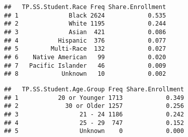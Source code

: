 \documentclass[]{article}
\newenvironment{Shaded}{\begin{snugshade}}{\end{snugshade}}
\newcommand{\KeywordTok}[1]{\textcolor[rgb]{0.13,0.29,0.53}{\textbf{#1}}}
\newcommand{\DataTypeTok}[1]{\textcolor[rgb]{0.13,0.29,0.53}{#1}}
\newcommand{\DecValTok}[1]{\textcolor[rgb]{0.00,0.00,0.81}{#1}}
\newcommand{\StringTok}[1]{\textcolor[rgb]{0.31,0.60,0.02}{#1}}
\newcommand{\OperatorTok}[1]{\textcolor[rgb]{0.81,0.36,0.00}{\textbf{#1}}}
\newcommand{\NormalTok}[1]{#1}
\begin{document}
\begin{verbatim}
##   TP.SS.Student.Race Freq Share.Enrollment
## 1              Black 2624            0.535
## 2              White 1195            0.244
## 3              Asian  421            0.086
## 4           Hispanic  376            0.077
## 5         Multi-Race  132            0.027
## 6    Native American   99            0.020
## 7   Pacific Islander   46            0.009
## 8            Unknown   10            0.002
\end{verbatim}

\begin{Shaded}
\end{Shaded}

\begin{verbatim}
##   TP.SS.Student.Age.Group Freq Share.Enrollment
## 1           20 or Younger 1713            0.349
## 2             30 or Older 1257            0.256
## 3                 21 - 24 1186            0.242
## 4                 25 - 29  747            0.152
## 5                 Unknown    0            0.000
\end{verbatim}
\end{document}
